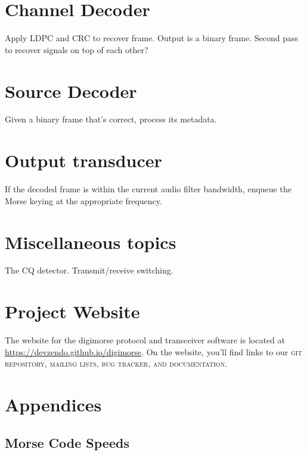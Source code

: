 \documentclass[a4paper]{tufte-handout}
\newcommand{\textls}[2][5]{%
    \begingroup\addfontfeatures{LetterSpace=#1}#2\endgroup
  }
\renewcommand{\smallcapsspacing}[1]{\textls[10]{#1}}
\renewcommand{\smallcaps}[1]{\smallcapsspacing{\scshape\MakeTextLowercase{#1}}}
\begin{document}
\section{Channel Decoder}
Apply LDPC and CRC to recover frame. Output is a binary frame.
Second pass to recover signals on top of each other?

\section{Source Decoder}
Given a binary frame that's correct, process its metadata.

\section{Output transducer}
If the decoded frame is within the current audio filter bandwidth, enqueue the Morse keying at the appropriate frequency.

\section{Miscellaneous topics}
The CQ detector. Transmit/receive switching.

\pagebreak
\section{Project Website}

The website for the digimorse protocol and transceiver software is located at
\url{https://devzendo.github.io/digimorse}. On the website, you'll find
links to our \smallcaps{git} repository, mailing lists, bug tracker, and documentation.

\pagebreak
\appendix
\section*{Appendices}
\renewcommand{\thesubsection}{\Alph{subsection}}

\subsection{Morse Code Speeds}
\end{document}
